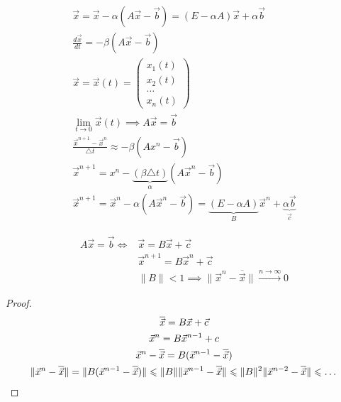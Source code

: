 \begin{gather*}
  \vec{x} = \vec{x} - \alpha(A\vec{x} - \vec{b}) = (E - \alpha A) \vec{x} +
  \alpha \vec{b}\\
  \frac{d\vec{x}}{dt} = - \beta (A \vec{x} - \vec{b})\\
  \vec{x} = \vec{x}(t) = \begin{pmatrix}
    x_1(t)\\
    x_2(t)\\
    \dots\\
    x_n(t)
  \end{pmatrix} \\
  \lim_{t \to 0} \vec{x}(t) \implies A\vec{x} = \vec{b} \\
  \frac{\vec{x}^{n + 1} - \vec{x}^n}{\triangle t} \approx - \beta (Ax^n -
  \vec{b}) \\
  \vec{x}^{n + 1} = x^n - \underbrace{(\beta \triangle t)}_{\alpha} (A\vec{x}^n
  - \vec{b}) \\
  \vec{x}^{n + 1} = \vec{x}^n - \alpha (A \vec{x}^n - \vec{b}) = \underbrace{(E
    - \alpha A)}_{B} \vec{x}^n + \underbrace{\alpha \vec{b}}_{\vec{c}}
\end{gather*}

\begin{note}
  \begin{align*}
    A \vec{x} = \vec{b} \iff &\vec{x} = B\vec{x} + \vec{c}\\
                             &\vec{x}^{n + 1} = B\vec{x}^n + \vec{c}\\
                             &\|B\| < 1 \implies \|\vec{x}^n - \overline{\vec{x}}\| \xrightarrow{n \to \infty} 0
  \end{align*}
\end{note}

\begin{proof}
  \begin{gather*}
    \overline{\vec{x}} = B \vec{x}+ \vec{c}\\
    \vec{x}^n = B \vec{x}^{n - 1} + c\\
    \vec{x}^n - \overline{\vec{x}} = B (\vec{x}^{n - 1} -\overline{\vec{x}}) \\
    \|\vec{x}^n - \overline{\vec{x}}\| = \|B(\vec{x}^{n - 1}
    -\overline{\vec{x}})\| \leq \|B\|\|\vec{x}^{n - 1} - \overline{\vec{x}}\|
    \leq \|B\|^2 \|\vec{x}^{n - 2} - \overline{\vec{x}}\| \leq \dots \qedhere
  \end{gather*}
\end{proof}


